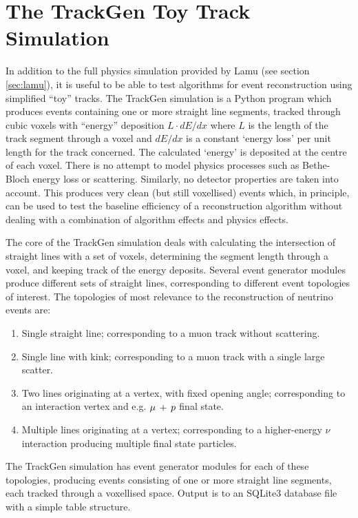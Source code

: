\section{The TrackGen Toy Track Simulation}
In addition to the full physics simulation provided by Lamu (see section \ref{sec:lamu}), it is useful to be able to test algorithms for event reconstruction using simplified ``toy'' tracks. The TrackGen simulation is a Python program which produces events containing one or more straight line segments, tracked through cubic voxels with ``energy'' deposition $L\cdot dE/dx$ where $L$ is the length of the track segment through a voxel and $dE/dx$ is a constant `energy loss' per unit length for the track concerned. The calculated `energy' is deposited at the centre of each voxel. There is no attempt to model physics processes such as Bethe-Bloch energy loss or scattering. Similarly, no detector properties are taken into account. This produces very clean (but still voxellised) events which, in principle, can be used to test the baseline efficiency of a reconstruction algorithm without dealing with a combination of algorithm effects and physics effects.

The core of the TrackGen simulation deals with calculating the intersection of straight lines with a set of voxels, determining the segment length through a voxel, and keeping track of the energy deposits. Several event generator modules produce different sets of straight lines, corresponding to different event topologies of interest. The topologies of most relevance to the reconstruction of neutrino events are:

\begin{enumerate}
    \item Single straight line; corresponding to a muon track without scattering.
    \item Single line with kink; corresponding to a muon track with a single large scatter.
    \item Two lines originating at a vertex, with fixed opening angle; corresponding to an interaction vertex and e.g. $\mu\,+\,p$ final state.
    \item Multiple lines originating at a vertex; corresponding to a higher-energy $\nu$ interaction producing multiple final state particles.
\end{enumerate}

The TrackGen simulation has event generator modules for each of these topologies, producing events consisting of one or more straight line segments, each tracked through a voxellised space. Output is to an SQLite3\citep{SQLite} database file with a simple table structure.


